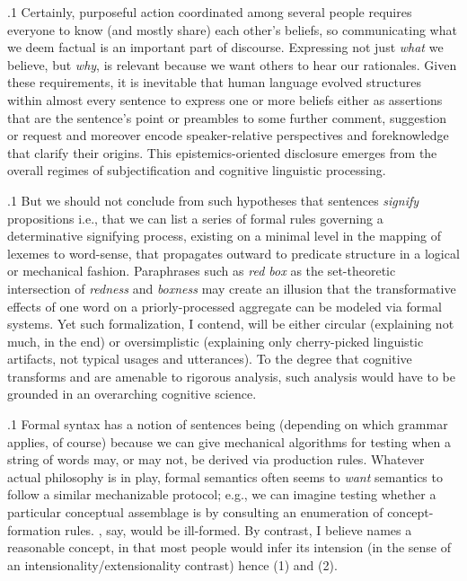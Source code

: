 \documentclass[11pt, twocolumn]{article}
\begin{document}
\p.1{%
\:\+Certainly, purposeful action coordinated among several people requires
everyone to know (and mostly share) each other's beliefs,
so communicating what we deem factual is an important part of
discourse. \>  Expressing not just \textit{what} we believe, but \textit{why},
is relevant because we want others to hear our rationales. \> 
Given these requirements, it is inevitable that human
language evolved structures within almost every sentence
to express one or more beliefs \mdash{} either as assertions that
are the sentence's point or preambles to some further
comment, suggestion or request \mdash{} and moreover
encode speaker-relative perspectives and foreknowledge that
clarify their origins. \>  This
epistemics-oriented \pgl{}disclosure
emerges from the overall regimes of subjectification and
cognitive linguistic processing.\<\;
}%

\p.1{%
\:\+But we should not conclude from such hypotheses that
sentences \textit{signify} propositions \mdash{} i.e., that
we can list a series of formal rules governing a determinative signifying process,
existing on a minimal level in the mapping of lexemes
to word-sense, that propagates outward to predicate
structure in a logical or mechanical fashion. \> 
Paraphrases such as \textit{red box} as the set-theoretic
intersection of \textit{redness} and \textit{boxness} may
create an illusion that the transformative
effects of one word on a priorly-processed aggregate
can be modeled via formal systems. \>  Yet such
formalization, I contend, will be either circular
(explaining not much, in the end) or oversimplistic
(explaining only cherry-picked linguistic artifacts,
not typical usages and utterances). \>  To the degree
that cognitive transforms and  are
amenable to rigorous analysis, such analysis
would have to be grounded in an overarching
cognitive science.\<\;
}%

\p.1{%
\:\+Formal syntax has a notion of sentences being 
(depending on which grammar applies, of course) because we can give
mechanical algorithms for testing when a string of words may, or may not,
be derived via production rules. \>  Whatever actual philosophy is in play,
formal semantics often seems to \textit{want} semantics to follow a
similar mechanizable protocol; e.g., we can imagine testing whether a
particular conceptual assemblage is  by
consulting an enumeration of concept-formation rules. \> 
, say, would be ill-formed. \>  By contrast,
I believe  names a reasonable concept, in
that most people would infer its intension (in the sense of an
intensionality/extensionality contrast) \mdash{} hence \exsRef(1) and \exsRef(2).\<\;
}%
\end{document}
